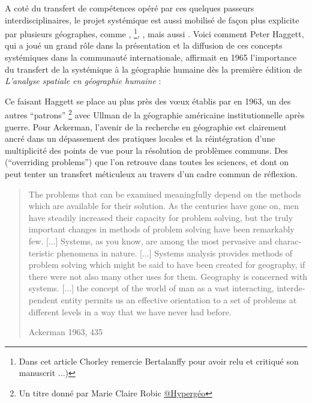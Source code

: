 A coté du transfert de compétences opéré par ces quelques passeurs interdisciplinaires, le projet systémique est aussi mobilisé de façon plus explicite par plusieurs géographes, comme \textcite{Ackerman1963}, \textcite{Chorley1962} \footnote{Dans cet article Chorley remercie Bertalanffy pour avoir relu et critiqué son manuscrit ...)}, \textcite{Haggett1965}, mais aussi \textcite{Berry1964a}. Voici comment Peter Haggett, qui a joué un grand rôle dans la présentation et la diffusion de ces concepts systémiques dans la communauté internationale, affirmait en 1965 l'importance du transfert de la systémique à la géographie humaine dès la première édition de \textit{L’analyse spatiale en géographie humaine} : 

Ce faisant Haggett se place au plus près des vœux établis par \textcite{Ackerman1963} en 1963, un des autres \enquote{patrons} \footnote{Un titre donné par Marie Claire Robic \href{http://www.hypergeo.eu/spip.php?article469}{@Hypergéo}} avec Ullman de la géographie américaine institutionnelle après guerre. Pour Ackerman, l'avenir de la recherche en géographie est clairement ancré dans un dépassement des pratiques locales et la réintégration d'une multiplicité des points de vue pour la résolution de problèmes communs. Des (\foreignquote{english}{overriding problems}) que l'on retrouve dans toutes les sciences, et dont on peut tenter un transfert méticuleux au travers d'un cadre commun de réflexion.

\foreignblockquote{english}[Ackerman 1963, 435]{The problems that can be examined meaningfully depend on the methods which are available for their solution. As the centuries have gone on, men have steadily increased their capacity for problem solving, but the truly important changes in methods of problem solving have been remarkably few. [...] Systems, as you know, are among the most pervasive and characteristic phenomena in nature. [...] Systems analysis provides methods of problem solving which might be said to have been created for geography, if there were not also many other uses for them. Geography is concerned with systems. [...] the concept of the world of man as a vast interacting, interdependent entity permits us an effective orientation to a set of problems at different levels in a way that we have never had before.}

